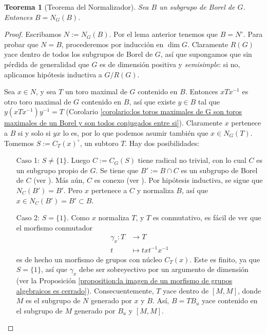 \documentclass[spanish,12pt]{amsart}
\newtheorem{theorem}{Teorema}[section]
\theoremstyle{definition}
\theoremstyle{remark}
\numberwithin{equation}{section}
\begin{document}
\begin{theorem}[Teorema del Normalizador]\label{teorema:teorema del normalizador}
Sea $B$ un subgrupo de Borel de $G$. Entonces $B = N_G (B)$.
\end{theorem}
\begin{proof}
Escribamos $N := N_G (B)$. Por el lema anterior tenemos que $B = N^\circ$. Para probar que $N = B$, procederemos por inducción en $\dim G$. Claramente $R(G)$ yace dentro de todos los subgrupos de Borel de $G$, así que supongamos que sin pérdida de generalidad que $G$ es de dimensión positiva y \textit{semisimple}: si no, aplicamos hipótesis inductiva a $G/R(G)$.

Sea $x \in N$, y sea $T$ un toro maximal de $G$ contenido en $B$. Entonces $x T x^{-1}$ es otro toro maximal de $G$ contenido en $B$, así que existe $y \in B$ tal que $y( x T x^{-1})y^{-1} = T$ (Corolario \ref{corolario:los toros maximales de G son toros maximales de un Borel y son todos conjugados entre si}). Claramente $x $ pertenece a $B$ si y solo si $yx$ lo es, por lo que podemos asumir también que $x \in N_G (T)$. Tomemos $S := C_T (x)^\circ$, un subtoro $T$. Hay dos posibilidades:
\begin{enumerate}
\item[Caso 1:] $S \neq \{1\}$. Luego $C := C_G (S)$ tiene radical no trivial, con lo cual $C$ es un subgrupo propio de $G$. Se tiene que $B' := B \cap C$ es un subgrupo de Borel de $C$ (ver \cite[\S 22.4]{humphreys2012linearAlgebraicGroups}). Más aún, $C$ es conexo (ver \cite[Teorema 22.3]{humphreys2012linearAlgebraicGroups}). Por hipótesis inductiva, se sigue que $N_C (B') = B'$. Pero $x$ pertenece a $C$ y normaliza $B$, así que $x \in N_C (B') = B' \subset B$.
\item[Caso 2:] $S = \{1\}$. Como $x$ normaliza $T$, y $T$ es conmutativo, es fácil de ver que el morfismo conmutador
\begin{align*}
\gamma_x : T &\longrightarrow T \\
t &\longmapsto t x t^{-1}x^{-1}
\end{align*}
es de hecho un morfismo de grupos con núcleo $C_T (x)$. Este es finito, ya que $S = \{1\}$, así que $\gamma_x$ debe ser sobreyectivo por un argumento de dimensión (ver la Proposición \ref{proposition:la imagen de un morfismo de grupos algebraicos es cerrado}). Consecuentemente, $T$ yace dentro de $[M, M]$, donde $M$ es el subgrupo de $N$ generado por $x$ y $B$. Así, $B = T B_u$ yace contenido en el subgrupo de $M$ generado por $B_u$ y $[M,M]$.


\end{enumerate}
\end{proof}
\end{document}
